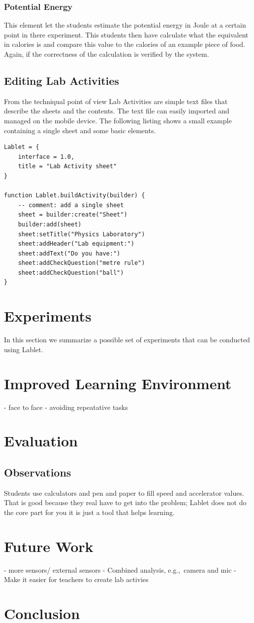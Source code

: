 \documentclass{sigchi}
\newcommand{\eg}{e.g.,\ }
\begin{document}
\subsubsection*{Potential Energy}
This element let the students estimate the potential energy in Joule
at a certain point in there experiment.  This students then have
calculate what the equivalent in calories is and compare this value to
the calories of an example piece of food.  Again, if the correctness
of the calculation is verified by the system.

\subsection{Editing Lab Activities}
From the techniqual point of view Lab Activities are simple text files
that describe the sheets and the contents.  The text file can easily
imported and managed on the mobile device.  The following listing
shows a small example containing a single sheet and some basic
elements.

\begin{lstlisting}
Lablet = {
    interface = 1.0,
    title = "Lab Activity sheet"
}
 
function Lablet.buildActivity(builder) {
    -- comment: add a single sheet
    sheet = builder:create("Sheet")
    builder:add(sheet)
    sheet:setTitle("Physics Laboratory")
    sheet:addHeader("Lab equipment:")
    sheet:addText("Do you have:")
    sheet:addCheckQuestion("metre rule")
    sheet:addCheckQuestion("ball")
}
\end{lstlisting}


\section{Experiments}
In this section we summarize a possible set of experiments that can be
conducted using Lablet.

\section{Improved Learning Environment}
- face to face 
- avoiding repeatative tasks

\section{Evaluation}

\subsection{Observations}
Students use calculators and pen and paper to fill speed and
accelerator values.  That is good because they real have to get into
the problem; Lablet does not do the core part for you it is just a
tool that helps learning.

\section{Future Work}
- more sensors/ external sensors
- Combined analysis, \eg camera and mic
- Make it easier for teachers to create lab activies

\section{Conclusion}



\end{document}

